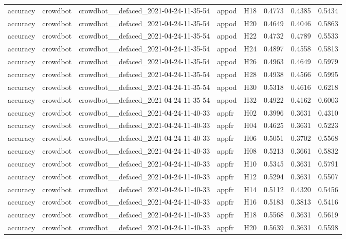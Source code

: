 \begin{table}[tbp]
\begin{tabular}{lllllrrr}
accuracy & crowdbot & crowdbot\_\_defaced\_2021-04-24-11-35-54 & appod & H18 & 0.4773 & 0.4385 & 0.5434 \\
accuracy & crowdbot & crowdbot\_\_defaced\_2021-04-24-11-35-54 & appod & H20 & 0.4649 & 0.4046 & 0.5863 \\
accuracy & crowdbot & crowdbot\_\_defaced\_2021-04-24-11-35-54 & appod & H22 & 0.4732 & 0.4789 & 0.5533 \\
accuracy & crowdbot & crowdbot\_\_defaced\_2021-04-24-11-35-54 & appod & H24 & 0.4897 & 0.4558 & 0.5813 \\
accuracy & crowdbot & crowdbot\_\_defaced\_2021-04-24-11-35-54 & appod & H26 & 0.4963 & 0.4649 & 0.5979 \\
accuracy & crowdbot & crowdbot\_\_defaced\_2021-04-24-11-35-54 & appod & H28 & 0.4938 & 0.4566 & 0.5995 \\
accuracy & crowdbot & crowdbot\_\_defaced\_2021-04-24-11-35-54 & appod & H30 & 0.5318 & 0.4616 & 0.6218 \\
accuracy & crowdbot & crowdbot\_\_defaced\_2021-04-24-11-35-54 & appod & H32 & 0.4922 & 0.4162 & 0.6003 \\
accuracy & crowdbot & crowdbot\_\_defaced\_2021-04-24-11-40-33 & appfr & H02 & 0.3996 & 0.3631 & 0.4310 \\
accuracy & crowdbot & crowdbot\_\_defaced\_2021-04-24-11-40-33 & appfr & H04 & 0.4625 & 0.3631 & 0.5223 \\
accuracy & crowdbot & crowdbot\_\_defaced\_2021-04-24-11-40-33 & appfr & H06 & 0.5051 & 0.3702 & 0.5568 \\
accuracy & crowdbot & crowdbot\_\_defaced\_2021-04-24-11-40-33 & appfr & H08 & 0.5213 & 0.3661 & 0.5832 \\
accuracy & crowdbot & crowdbot\_\_defaced\_2021-04-24-11-40-33 & appfr & H10 & 0.5345 & 0.3631 & 0.5791 \\
accuracy & crowdbot & crowdbot\_\_defaced\_2021-04-24-11-40-33 & appfr & H12 & 0.5294 & 0.3631 & 0.5507 \\
accuracy & crowdbot & crowdbot\_\_defaced\_2021-04-24-11-40-33 & appfr & H14 & 0.5112 & 0.4320 & 0.5456 \\
accuracy & crowdbot & crowdbot\_\_defaced\_2021-04-24-11-40-33 & appfr & H16 & 0.5183 & 0.3813 & 0.5416 \\
accuracy & crowdbot & crowdbot\_\_defaced\_2021-04-24-11-40-33 & appfr & H18 & 0.5568 & 0.3631 & 0.5619 \\
accuracy & crowdbot & crowdbot\_\_defaced\_2021-04-24-11-40-33 & appfr & H20 & 0.5639 & 0.3631 & 0.5598 \\

\end{tabular}
\end{table}

